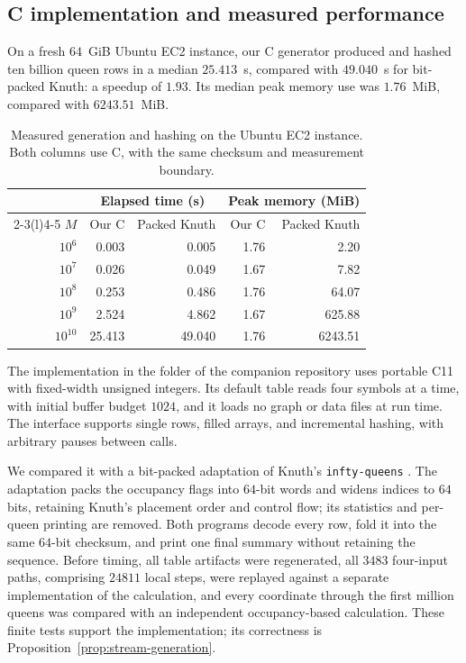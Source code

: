 \subsection{C implementation and measured performance}\label{sec:generation-benchmarks}

On a fresh $64$~GiB Ubuntu EC2 instance, our C generator produced and
hashed ten billion queen rows in a median $25.413$~s, compared with
$49.040$~s for bit-packed Knuth: a speedup of $1.93$. Its median peak
memory use was $1.76$~MiB, compared with $6243.51$~MiB.

\begin{table}[!ht]
\centering
\begin{tabular}{@{}r r r r r@{}}
\toprule
& \multicolumn{2}{c}{Elapsed time (s)}
& \multicolumn{2}{c}{Peak memory (MiB)}\\
\cmidrule(lr){2-3}\cmidrule(l){4-5}
$M$ & Our C & Packed Knuth & Our C & Packed Knuth\\
\midrule
$10^{6}$ & 0.003 & 0.005 & 1.76 & 2.20\\
$10^{7}$ & 0.026 & 0.049 & 1.67 & 7.82\\
$10^{8}$ & 0.253 & 0.486 & 1.76 & 64.07\\
$10^{9}$ & 2.524 & 4.862 & 1.67 & 625.88\\
$10^{10}$ & 25.413 & 49.040 & 1.76 & 6243.51\\
\bottomrule
\end{tabular}
\caption{Measured generation and hashing on the Ubuntu EC2
instance. Both columns use C, with the same checksum and
measurement boundary.}
\label{tab:c-generation}
\end{table}

The implementation in the folder  of the
companion repository uses portable
C11 with fixed-width unsigned integers. Its default table reads four
symbols at a time, with initial buffer budget $1024$, and it loads no
graph or data files at run time. The interface supports single rows,
filled arrays, and incremental hashing, with arbitrary pauses between
calls.

We compared it with a bit-packed adaptation of Knuth's
\texttt{infty-queens} \cite{KnuthQueens}. The adaptation packs the
occupancy flags into $64$-bit words and widens indices to $64$ bits,
retaining Knuth's placement order and control flow; its statistics
and per-queen printing are removed. Both programs decode every row,
fold it into the same $64$-bit checksum, and print one final summary
without retaining the sequence. Before timing, all table artifacts
were regenerated, all $3483$ four-input paths, comprising $24811$
local steps, were replayed against a separate implementation of the
calculation, and every coordinate through the first million queens was
compared with an independent occupancy-based calculation. These finite
tests support the implementation; its correctness is
Proposition~\ref{prop:stream-generation}.

